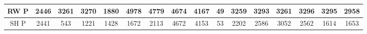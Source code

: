 \begin{table}[H]
\begin{tabular}{|c|c|c|c|c|c|c|c|c|c|c|c|c|c|c|c|}
		RW P  & \cellcolor[HTML]{ECF4FF}2446                                             & \cellcolor[HTML]{ECF4FF}3261                                             & \cellcolor[HTML]{ECF4FF}3270                                             & \cellcolor[HTML]{ECF4FF}1880                                            & \cellcolor[HTML]{ECF4FF}4978                                           & \cellcolor[HTML]{ECF4FF}4779                                           & \cellcolor[HTML]{ECF4FF}4674                                           & \cellcolor[HTML]{ECF4FF}4167                                             & \cellcolor[HTML]{ECF4FF}49                                               & \cellcolor[HTML]{ECF4FF}3259                                             & \cellcolor[HTML]{ECF4FF}3293                                             & \cellcolor[HTML]{ECF4FF}3261                                             & \cellcolor[HTML]{ECF4FF}3296                                             & \cellcolor[HTML]{ECF4FF}3295                                             & \cellcolor[HTML]{ECF4FF}2958                                             \\ \hline
		SH P  & \cellcolor[HTML]{CBCEFB}2441                                             & \cellcolor[HTML]{CBCEFB}543                                              & \cellcolor[HTML]{CBCEFB}1221                                             & \cellcolor[HTML]{CBCEFB}1428                                            & \cellcolor[HTML]{CBCEFB}1672                                           & \cellcolor[HTML]{CBCEFB}2113                                           & \cellcolor[HTML]{CBCEFB}4672                                           & \cellcolor[HTML]{CBCEFB}4153                                             & \cellcolor[HTML]{CBCEFB}53                                               & \cellcolor[HTML]{CBCEFB}2202                                             & \cellcolor[HTML]{CBCEFB}2586                                             & \cellcolor[HTML]{CBCEFB}3052                                             & \cellcolor[HTML]{CBCEFB}2562                                             & \cellcolor[HTML]{CBCEFB}1614                                             & \cellcolor[HTML]{CBCEFB}1653                                             \\ \hline

\end{tabular}
\end{table}
